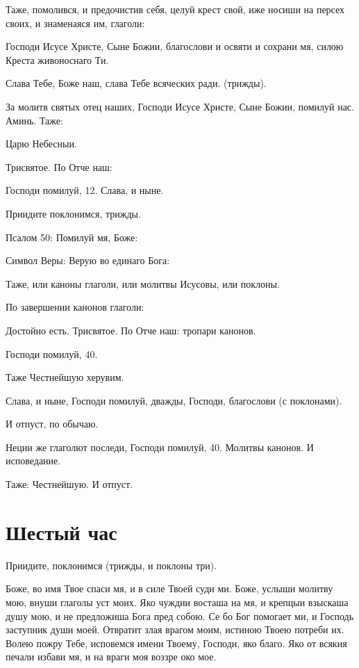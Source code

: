 Таже, помолився, и предочистив себя, целуй крест свой, иже носиши на персех своих, и знаменаяся им, глаголи:

Господи Исусе Христе, Сыне Божии, благослови и освяти и сохрани мя, силою Креста живоноснаго Ти.


Слава Тебе, Боже наш, слава Тебе всяческих ради. (трижды).

За молитв святых отец наших, Господи Исусе Христе, Сыне Божии, помилуй нас. Аминь. Таже:

Царю Небесныи.

Трисвятое. По Отче наш:

Господи помилуй, 12. Слава, и ныне.

Приидите поклонимся, трижды.

Псалом 50: Помилуй мя, Боже:

Символ Веры: Верую во единаго Бога:

Таже, или каноны глаголи, или молитвы Исусовы, или поклоны.

По завершении канонов глаголи:

Достойно есть. Трисвятое. По Отче наш: тропари канонов.

Господи помилуй, 40.

Таже Честнейшую херувим.

Слава, и ныне, Господи помилуй, дважды, Господи, благослови (с поклонами).

И отпуст, по обычаю.

Неции же глаголют последи, Господи помилуй, 40. Молитвы канонов. И исповедание.

Таже: Честнейшую. И отпуст.
\longpage[2]\mychapterending[1]


 

\section{Шестый час}
 


Приидите, поклонимся (трижды, и поклоны три).




Боже, во имя Твое спаси мя, и в силе Твоей суди ми. Боже, услыши молитву мою, внуши глаголы уст моих. Яко чуждии восташа на мя, и крепцыи взыскаша душу мою, и не предложиша Бога пред собою. Се бо Бог помогает ми, и Господь заступник души моей. Отвратит злая врагом моим, истиною Твоею потреби их. Волею пожру Тебе, исповемся имени Твоему, Господи, яко благо. Яко от всякия печали избави мя, и на враги моя воззре око мое.



